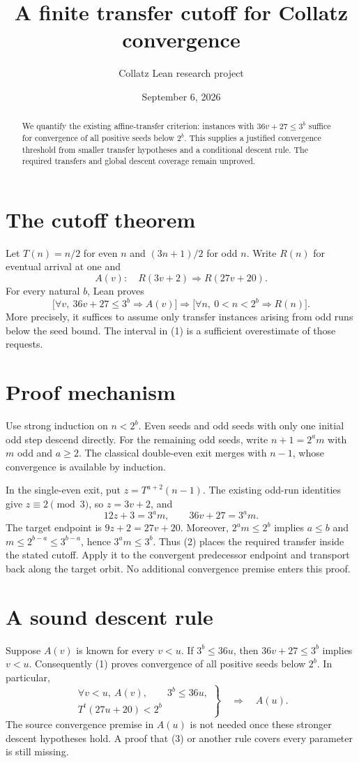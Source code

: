 \documentclass[10pt]{article}
\title{\vspace{-0.8cm}A finite transfer cutoff for Collatz convergence}
\author{Collatz Lean research project}
\date{September 6, 2026}
\begin{document}
\maketitle\vspace{-0.4cm}
\begin{abstract}
We quantify the existing affine-transfer criterion: instances with $36v+27\le3^b$ suffice for convergence of all positive seeds below $2^b$. This supplies a justified convergence threshold from smaller transfer hypotheses and a conditional descent rule. The required transfers and global descent coverage remain unproved.
\end{abstract}
\section{The cutoff theorem}
Let $T(n)=n/2$ for even $n$ and $(3n+1)/2$ for odd $n$. Write $R(n)$ for eventual arrival at one and
\[
 A(v):\quad R(3v+2)\Longrightarrow R(27v+20).
\]
For every natural $b$, Lean proves
\[
 \bigl[\forall v,\ 36v+27\le3^b\Longrightarrow A(v)\bigr]
 \Longrightarrow \bigl[\forall n,\ 0<n<2^b\Longrightarrow R(n)\bigr]. \tag{1}
\]
More precisely, it suffices to assume only transfer instances arising from odd runs below the seed bound. The interval in (1) is a sufficient overestimate of those requests.
\section{Proof mechanism}
Use strong induction on $n<2^b$. Even seeds and odd seeds with only one initial odd step descend directly. For the remaining odd seeds, write $n+1=2^a m$ with $m$ odd and $a\ge2$. The classical double-even exit merges with $n-1$, whose convergence is available by induction.

In the single-even exit, put $z=T^{a+2}(n-1)$. The existing odd-run identities give $z\equiv2\pmod3$, so $z=3v+2$, and
\[
 12z+3=3^a m,\qquad 36v+27=3^a m.                  \tag{2}
\]
The target endpoint is $9z+2=27v+20$. Moreover, $2^a m\le2^b$ implies $a\le b$ and $m\le2^{b-a}\le3^{b-a}$, hence $3^a m\le3^b$. Thus (2) places the required transfer inside the stated cutoff. Apply it to the convergent predecessor endpoint and transport back along the target orbit. No additional convergence premise enters this proof.
\section{A sound descent rule}
Suppose $A(v)$ is known for every $v<u$. If $3^b\le36u$, then $36v+27\le3^b$ implies $v<u$. Consequently (1) proves convergence of all positive seeds below $2^b$. In particular,
\[
 \left.
 \begin{gathered}
 \forall v<u,\ A(v),\qquad 3^b\le36u,\\
 T^t(27u+20)<2^b
 \end{gathered}\right\}\quad\Longrightarrow\quad A(u).       \tag{3}
\]
The source convergence premise in $A(u)$ is not needed once these stronger descent hypotheses hold. A proof that (3) or another rule covers every parameter is still missing.
\end{document}
